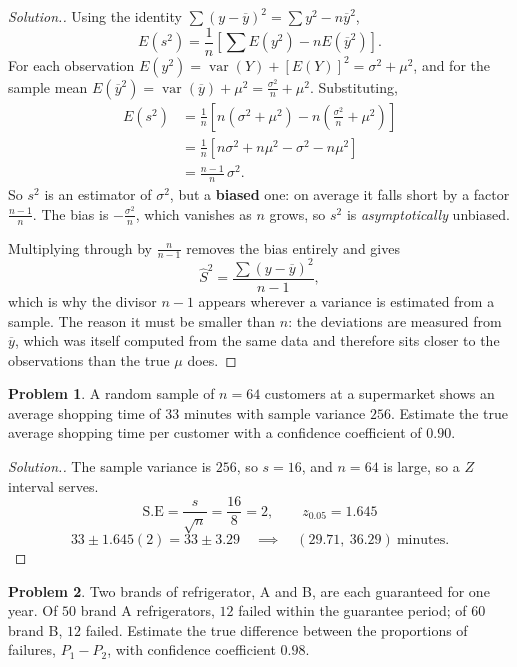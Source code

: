\documentclass[11pt,a4paper]{article}
\theoremstyle{definition}
\newtheorem{problemx}{Problem}[section]
\newenvironment{problem}{\begin{problemx}}{\end{problemx}}
\newenvironment{solution}
  {\renewcommand{\qedsymbol}{}\begin{proof}[\textit{Solution}.]}
  {\end{proof}}
\begin{document}
\begin{solution}
Using the identity $\sum(y-\overline{y})^2=\sum y^2-n\overline{y}^2$,
\[E(s^2)=\frac{1}{n}\left[\sum E(y^2)-nE(\overline{y}^2)\right].\]
For each observation $E(y^2)=\operatorname{var}(Y)+[E(Y)]^2=\sigma^2+\mu^2$, and for the
sample mean $E(\overline{y}^2)=\operatorname{var}(\overline{y})+\mu^2=\frac{\sigma^2}{n}+\mu^2$.
Substituting,
\begin{align*}
E(s^2)&=\frac{1}{n}\left[n(\sigma^2+\mu^2)-n\left(\frac{\sigma^2}{n}+\mu^2\right)\right]\\
&=\frac{1}{n}\left[n\sigma^2+n\mu^2-\sigma^2-n\mu^2\right]\\
&=\frac{n-1}{n}\,\sigma^2.
\end{align*}
So $s^2$ is an estimator of $\sigma^2$, but a \textbf{biased} one: on average it falls short
by a factor $\frac{n-1}{n}$. The bias is $-\frac{\sigma^2}{n}$, which vanishes as $n$ grows,
so $s^2$ is \emph{asymptotically} unbiased.

Multiplying through by $\frac{n}{n-1}$ removes the bias entirely and gives
\[\widehat{S}^2=\frac{\sum(y-\overline{y})^2}{n-1},\]
which is why the divisor $n-1$ appears wherever a variance is estimated from a sample. The
reason it must be smaller than $n$: the deviations are measured from $\overline{y}$, which
was itself computed from the same data and therefore sits closer to the observations than
the true $\mu$ does.
\end{solution}

\begin{problem}
A random sample of $n=64$ customers at a supermarket shows an average shopping time of $33$
minutes with sample variance $256$. Estimate the true average shopping time per customer
with a confidence coefficient of $0.90$.
\end{problem}

\begin{solution}
The sample variance is $256$, so $s=16$, and $n=64$ is large, so a $Z$ interval serves.
\[\text{S.E}=\frac{s}{\sqrt{n}}=\frac{16}{8}=2,\qquad z_{0.05}=1.645\]
\[33\pm 1.645(2)=33\pm 3.29\quad\implies\quad (29.71,\ 36.29)\ \text{minutes}.\]
\end{solution}

\begin{problem}
Two brands of refrigerator, A and B, are each guaranteed for one year. Of $50$ brand A
refrigerators, $12$ failed within the guarantee period; of $60$ brand B, $12$ failed.
Estimate the true difference between the proportions of failures, $P_1-P_2$, with confidence
coefficient $0.98$.
\end{problem}
\end{document}

